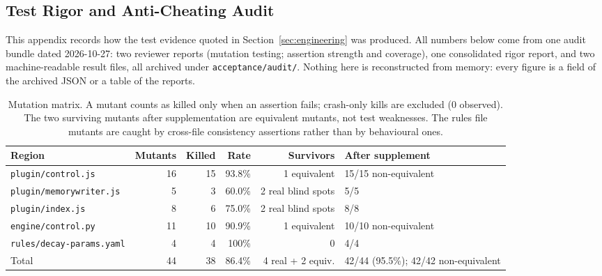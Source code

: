 \subsection{Test Rigor and Anti-Cheating Audit}\label{app:audit}

This appendix records how the test evidence quoted in
Section~\ref{sec:engineering} was produced. All numbers below come from one
audit bundle dated 2026-10-27: two reviewer reports (mutation testing; assertion
strength and coverage), one consolidated rigor report, and two machine-readable
result files, all archived under \texttt{acceptance/audit/}. Nothing here is
reconstructed from memory: every figure is a field of the archived JSON or a
table of the reports.

\begin{table}[t]
\centering
\caption{Mutation matrix. A mutant counts as killed only when an assertion
fails; crash-only kills are excluded (0 observed). The two surviving mutants
after supplementation are equivalent mutants, not test weaknesses. The rules
file mutants are caught by cross-file consistency assertions rather than by
behavioural ones.}
\label{tab:mutants}
\small
\begin{tabular}{lrrrrl}
\toprule
Region & Mutants & Killed & Rate & Survivors & After supplement \\
\midrule
\texttt{plugin/control.js}      & 16 & 15 & 93.8\% & 1 equivalent      & 15/15 non-equivalent \\
\texttt{plugin/\allowbreak{}memorywriter.\allowbreak{}js} &  5 &  3 & 60.0\% & 2 real blind spots & 5/5 \\
\texttt{plugin/index.js}        &  8 &  6 & 75.0\% & 2 real blind spots & 8/8 \\
\texttt{engine/control.py}      & 11 & 10 & 90.9\% & 1 equivalent      & 10/10 non-equivalent \\
\texttt{rules/\allowbreak{}decay-\allowbreak{}params.\allowbreak{}yaml}&  4 &  4 & 100\%  & 0                 & 4/4 \\
\midrule
Total                           & 44 & 38 & 86.4\% & 4 real + 2 equiv. & 42/44 (95.5\%); 42/42 non-equivalent \\
\bottomrule
\end{tabular}
\end{table}

